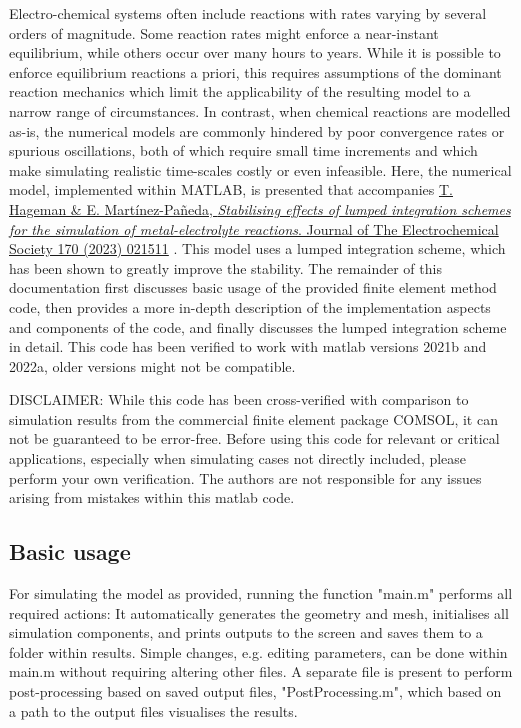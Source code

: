 \documentclass[3p]{elsarticle} %
\newcommand{\citeMe}{\href{http://doi.org/10.1149/1945-7111/acb971}{T. Hageman \& E. Martínez-Pañeda, \textit{Stabilising effects of lumped integration schemes for the simulation of metal-electrolyte reactions}. Journal of The Electrochemical Society 170 (2023) 021511} \citep{Hageman2023}}
\begin{document}
Electro-chemical systems often include reactions with rates varying by several orders of magnitude. Some reaction rates might enforce a near-instant equilibrium, while others occur over many hours to years. While it is possible to enforce equilibrium reactions a priori, this requires assumptions of the dominant reaction mechanics which limit the applicability of the resulting model to a narrow range of circumstances. In contrast, when chemical reactions are modelled as-is, the numerical models are commonly hindered by poor convergence rates or spurious oscillations, both of which require small time increments and which make simulating realistic time-scales costly or even infeasible. Here, the numerical model, implemented within MATLAB, is presented that accompanies \citeMe{}. This model uses a lumped integration scheme, which has been shown to greatly improve the stability. The remainder of this documentation first discusses basic usage of the provided finite element method code, then provides a more in-depth description of the implementation aspects and components of the code, and finally discusses the lumped integration scheme in detail. This code has been verified to work with matlab versions 2021b and 2022a, older versions might not be compatible. 

DISCLAIMER: While this code has been cross-verified with comparison to simulation results from the commercial finite element package COMSOL, it can not be guaranteed to be error-free. Before using this code for relevant or critical applications, especially when simulating cases not directly included, please perform your own verification. The authors are not responsible for any issues arising from mistakes within this matlab code.

\subsection{Basic usage}
For simulating the model as provided, running the function "main.m" performs all required actions: It automatically generates the geometry and mesh, initialises all simulation components, and prints outputs to the screen and saves them to a folder within results. Simple changes, e.g. editing parameters, can be done within main.m without requiring altering other files. A separate file is present to perform post-processing based on saved output files, "PostProcessing.m", which based on a path to the output files visualises the results.
\end{document}
